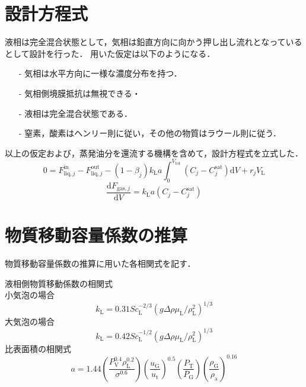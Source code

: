 \documentclass[a4j]{jsreport}
\newcommand{\diff}{\mathrm{d}}
\begin{document}
\section{設計方程式}
液相は完全混合状態として，気相は鉛直方向に向かう押し出し流れとなっているとして設計を行った．
用いた仮定は以下のようになる．
\begin{itemize}
    \item[-] 気相は水平方向に一様な濃度分布を持つ．
    \item[-] 気相側境膜抵抗は無視できる・
    \item[-] 液相は完全混合状態である．
    \item[-] 窒素，酸素はヘンリー則に従い，その他の物質はラウール則に従う．
\end{itemize}
以上の仮定および，蒸発油分を還流する機構を含めて，設計方程式を立式した．\\
\begin{equation*}
    0 = F^\text{in}_{\text{liq},j} - F^\text{out}_{\text{liq},j} - (1-\beta_j) k_\mathrm{L}a
    \int^{V_\text{tot}}_0(C_j - C^\text{sat}_j) \diff V + r_j V_\mathrm{L}
\end{equation*}
\begin{equation*}
    \frac{ \diff F_{\text{gas},j}}{\diff V} = k_\mathrm{L}a (C_j - C^\text{sat}_j)
\end{equation*}

\section{物質移動容量係数の推算}
物質移動容量係数の推算に用いた各相関式を記す．

液相側物質移動係数の相関式\\
小気泡の場合
\begin{equation}
    k_\mathrm{L} = 0.31Sc_\mathrm{L}^{-2/3}(g \Delta \rho \mu_\mathrm{L}/\rho_\mathrm{L}^2)^{1/3}
\end{equation}
大気泡の場合
\begin{equation}
    k_\mathrm{L} = 0.42Sc_\mathrm{L}^{-1/2}(g \Delta \rho \mu_\mathrm{L}/\rho_\mathrm{L}^2)^{1/3}
\end{equation}
比表面積の相関式
\begin{equation}
    a = 1.44 \left( \frac{P_\mathrm{V}^{0.4} \rho_\mathrm{L}^{0.2} }{ \sigma^{0.6}} \right) \left( \frac{u_\mathrm{G}}{u_\mathrm{t}} \right)^{0.5} \left( \frac{P_\mathrm{T}}{P_\mathrm{G}} \right) \left( \frac{\rho_\mathrm{G}}{\rho_\mathrm{a}} \right)^{0.16}
\end{equation}
\end{document}
